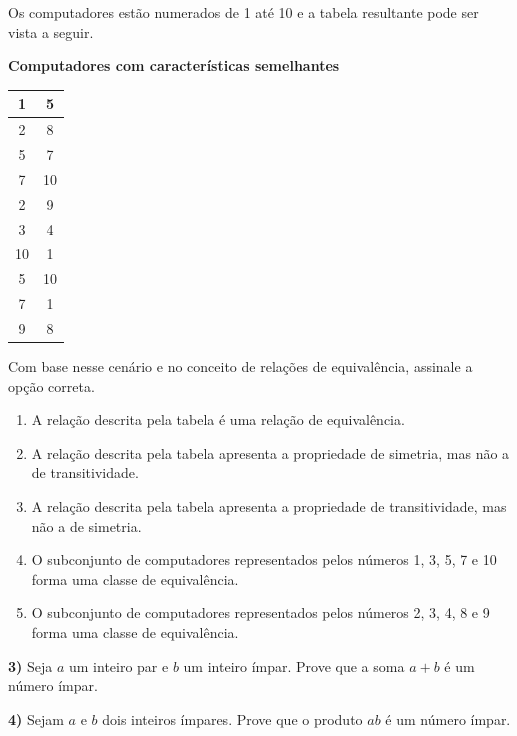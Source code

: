 \documentclass[12pt,a4paper]{article}
\newcommand{\resposta}[1]{
\noindent
\framebox[\textwidth]{
\begin{minipage}{0.98\textwidth}
\vspace{#1}
\end{minipage}
}
}
\begin{document}
Os computadores estão numerados de 1 até 10 e a tabela resultante pode ser vista a seguir.

\begin{center}
\textbf{Computadores com características semelhantes} \\
\vspace{0.2cm}
\begin{tabular}{|c|c|}
\hline
1 & 5 \\ \hline
2 & 8 \\ \hline
5 & 7 \\ \hline
7 & 10 \\ \hline
2 & 9 \\ \hline
3 & 4 \\ \hline
10 & 1 \\ \hline
5 & 10 \\ \hline
7 & 1 \\ \hline
9 & 8 \\ \hline
\end{tabular}
\end{center}

Com base nesse cenário e no conceito de relações de equivalência, assinale a opção correta.
 
\begin{enumerate}[label=\Alph*)]
    \item A relação descrita pela tabela é uma relação de equivalência.
    \item A relação descrita pela tabela apresenta a propriedade de simetria, mas não a de transitividade.
    \item A relação descrita pela tabela apresenta a propriedade de transitividade, mas não a de simetria.
    \item O subconjunto de computadores representados pelos números 1, 3, 5, 7 e 10 forma uma classe de equivalência.
    \item O subconjunto de computadores representados pelos números 2, 3, 4, 8 e 9 forma uma classe de equivalência.
\end{enumerate}
\vspace{0.8cm}
\vspace{0.8cm}

\textbf{3)} Seja $a$ um inteiro par e $b$ um inteiro ímpar. Prove que a soma $a+b$ é um número ímpar.

\vspace{0.2cm}
\resposta{4cm}
\vspace{0.8cm}

\textbf{4)} Sejam $a$ e $b$ dois inteiros ímpares. Prove que o produto $ab$ é um número ímpar.
\end{document}
